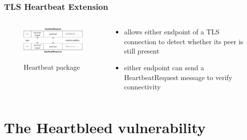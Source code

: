 \documentclass[
    11pt, %
    aspectratio=169, %
]{beamer}
\begin{document}
\begin{frame}
	\frametitle{TLS Heartbeat Extension}
            \begin{columns}[t] %
		\begin{column}{0.5\textwidth} %
                \begin{figure}[h!]
                    \centering
                    \caption{Heartbeat package}
                    \includegraphics[angle=0, width=8cm]{Images/heartbeat-packet.png}
                    \label{Heartbeat package}
                \end{figure}
		\end{column}
  		\begin{column}{0.5\textwidth} %
                \newline
                \begin{itemize}
                \item allows either endpoint of a TLS connection to detect whether its peer is still present
                \newline
                \newline
                \newline
                \newline
                \item either endpoint can \newline send a HeartbeatRequest \newline message to verify connectivity
            \end{itemize}
		\end{column}		
	\end{columns}
\end{frame}

\section{The Heartbleed vulnerability}
\end{document}
